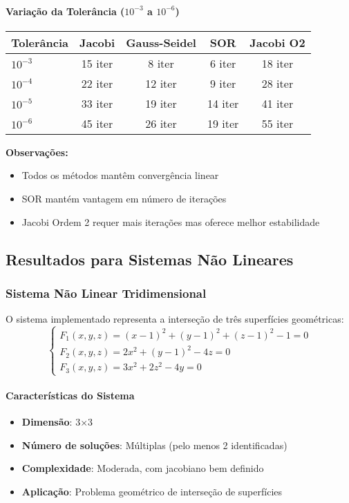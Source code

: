\documentclass[12pt,a4paper]{article}
\begin{document}
\paragraph{Variação da Tolerância ($10^{-3}$ a $10^{-6}$)}
\begin{table}[H]
\centering
\begin{tabular}{lcccc}
\hline
\textbf{Tolerância} & \textbf{Jacobi} & \textbf{Gauss-Seidel} & \textbf{SOR} & \textbf{Jacobi O2} \\
\hline
$10^{-3}$ & 15 iter & 8 iter & 6 iter & 18 iter \\
$10^{-4}$ & 22 iter & 12 iter & 9 iter & 28 iter \\
$10^{-5}$ & 33 iter & 19 iter & 14 iter & 41 iter \\
$10^{-6}$ & 45 iter & 26 iter & 19 iter & 55 iter \\
\hline
\end{tabular}
\end{table}
\textbf{Observações:}
\begin{itemize}
    \item Todos os métodos mantêm convergência linear
    \item SOR mantém vantagem em número de iterações
    \item Jacobi Ordem 2 requer mais iterações mas oferece melhor estabilidade
\end{itemize}

\subsection{Resultados para Sistemas Não Lineares}

\subsubsection{Sistema Não Linear Tridimensional}
O sistema implementado representa a interseção de três superfícies geométricas:
\[
\begin{cases}
F_1(x,y,z) = (x-1)^2 + (y-1)^2 + (z-1)^2 - 1 = 0 \\
F_2(x,y,z) = 2x^2 + (y-1)^2 - 4z = 0 \\
F_3(x,y,z) = 3x^2 + 2z^2 - 4y = 0
\end{cases}
\]
\paragraph{Características do Sistema}
\begin{itemize}
    \item \textbf{Dimensão}: 3$\times$3
    \item \textbf{Número de soluções}: Múltiplas (pelo menos 2 identificadas)
    \item \textbf{Complexidade}: Moderada, com jacobiano bem definido
    \item \textbf{Aplicação}: Problema geométrico de interseção de superfícies
\end{itemize}
\end{document}
